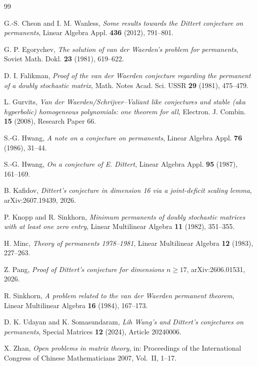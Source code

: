 \documentclass[11pt]{article}
\theoremstyle{definition}
\newcommand{\1}{\mathbf{1}}
\begin{document}
\begin{thebibliography}{99}

G.-S. Cheon and I. M. Wanless,
\emph{Some results towards the Dittert conjecture on permanents},
Linear Algebra Appl. \textbf{436} (2012), 791--801.

G. P. Egorychev,
\emph{The solution of van der Waerden's problem for permanents},
Soviet Math. Dokl. \textbf{23} (1981), 619--622.

D. I. Falikman,
\emph{Proof of the van der Waerden conjecture regarding the permanent of a doubly stochastic matrix},
Math. Notes Acad. Sci. USSR \textbf{29} (1981), 475--479.

L. Gurvits,
\emph{Van der Waerden/Schrijver--Valiant like conjectures and stable (aka hyperbolic) homogeneous polynomials: one theorem for all},
Electron. J. Combin. \textbf{15} (2008), Research Paper 66.

S.-G. Hwang,
\emph{A note on a conjecture on permanents},
Linear Algebra Appl. \textbf{76} (1986), 31--44.

S.-G. Hwang,
\emph{On a conjecture of E. Dittert},
Linear Algebra Appl. \textbf{95} (1987), 161--169.

B. Kafidov,
\emph{Dittert's conjecture in dimension 16 via a joint-deficit scaling lemma},
arXiv:2607.19439, 2026.

P. Knopp and R. Sinkhorn,
\emph{Minimum permanents of doubly stochastic matrices with at least one zero entry},
Linear Multilinear Algebra \textbf{11} (1982), 351--355.

H. Minc,
\emph{Theory of permanents 1978--1981},
Linear Multilinear Algebra \textbf{12} (1983), 227--263.

Z. Pang,
\emph{Proof of Dittert's conjecture for dimensions $n\ge17$},
arXiv:2606.01531, 2026.

R. Sinkhorn,
\emph{A problem related to the van der Waerden permanent theorem},
Linear Multilinear Algebra \textbf{16} (1984), 167--173.

D. K. Udayan and K. Somasundaram,
\emph{Lih Wang's and Dittert's conjectures on permanents},
Special Matrices \textbf{12} (2024), Article 20240006.

X. Zhan,
\emph{Open problems in matrix theory},
in: Proceedings of the International Congress of Chinese Mathematicians 2007, Vol.~II, 1--17.

\end{thebibliography}
\end{document}
